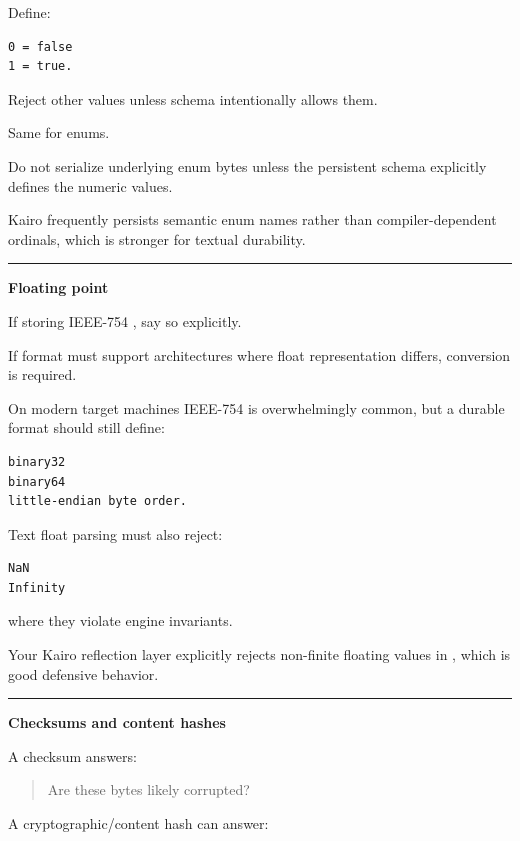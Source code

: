 Define:

\begin{verbatim}
0 = false
1 = true.
\end{verbatim}

Reject other values unless schema intentionally allows them.

Same for enums.

Do not serialize underlying enum bytes unless the persistent schema explicitly defines the numeric values.

Kairo frequently persists semantic enum names rather than compiler-dependent ordinals, which is stronger for textual durability.

\begin{center}\rule{0.5\linewidth}{0.5pt}\end{center}

\textbf{Floating point}

If storing IEEE-754 , say so explicitly.

If format must support architectures where float representation differs, conversion is required.

On modern target machines IEEE-754 is overwhelmingly common, but a durable format should still define:

\begin{verbatim}
binary32
binary64
little-endian byte order.
\end{verbatim}

Text float parsing must also reject:

\begin{verbatim}
NaN
Infinity
\end{verbatim}

where they violate engine invariants.

Your Kairo reflection layer explicitly rejects non-finite floating values in , which is good defensive behavior.

\begin{center}\rule{0.5\linewidth}{0.5pt}\end{center}

\textbf{Checksums and content hashes}

A checksum answers:

\begin{quote}
Are these bytes likely corrupted?
\end{quote}

A cryptographic/content hash can answer:

